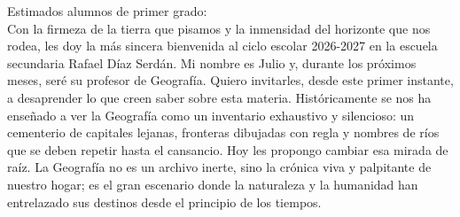 \documentclass[11pt]{report}
\begin{document}
\begin{titlepage}




\vspace{0.7em}

\raggedright Estimados alumnos de primer grado:\\

Con la firmeza de la tierra que pisamos y la inmensidad del horizonte que nos rodea, les doy la más sincera bienvenida al ciclo escolar 2026-2027 en la escuela secundaria Rafael Díaz Serdán. Mi nombre es Julio y, durante los próximos meses, seré su profesor de Geografía. Quiero invitarles, desde este primer instante, a desaprender lo que creen saber sobre esta materia. Históricamente se nos ha enseñado a ver la Geografía como un inventario exhaustivo y silencioso: un cementerio de capitales lejanas, fronteras dibujadas con regla y nombres de ríos que se deben repetir hasta el cansancio. Hoy les propongo cambiar esa mirada de raíz. La Geografía no es un archivo inerte, sino la crónica viva y palpitante de nuestro hogar; es el gran escenario donde la naturaleza y la humanidad han entrelazado sus destinos desde el principio de los tiempos.


\end{titlepage}
\end{document}
